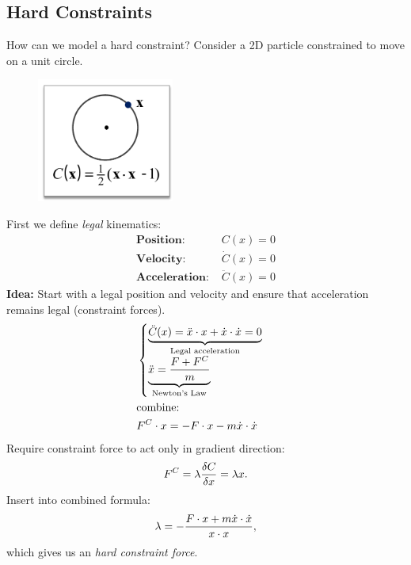 \begin{multicols}{2}
\section{Hard Constraints}
How can we model a hard constraint? Consider a 2D particle constrained to move on a unit circle.
\begin{figure}[H]
\centering
\includegraphics[width=0.40\textwidth]{img/02_hard_constraints_circle}
\end{figure}
First we define \emph{legal} kinematics:
\begin{align*}
	\textbf{Position: }&C(x) = 0\\
	\textbf{Velocity: }&\dot C(x) = 0\\
	\textbf{Acceleration: }&\ddot C(x) = 0
\end{align*}
\textbf{Idea:} Start with a legal position and velocity and ensure that acceleration remains legal (constraint forces).
\begin{align*}
	&\begin{cases}
	\underbrace{\ddot C(x) = \ddot x \cdot x + \dot x \cdot \dot x = 0}_\text{Legal acceleration}\\
	\underbrace{ \ddot x = {F + F^C \over m} }_\text{Newton's Law}
	\end{cases}\\
	 &\text{combine:}\\
	&F^C \cdot x = -F\cdot x - m\dot x \cdot \dot x
\end{align*}
Require constraint force to act only in gradient direction:
\begin{align*}
	F^C = \lambda {\delta C \over \delta x} = \lambda x.
\end{align*}
Insert into combined formula:
\begin{align*}
	\lambda = - {F\cdot x + m \dot x \cdot \dot x \over x \cdot x},
\end{align*}
which gives us an \emph{hard constraint force}.


\end{multicols}
